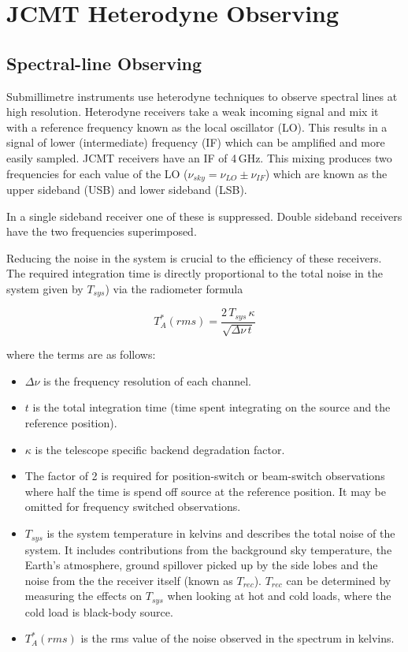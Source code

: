 \documentclass[twoside,11pt]{article}
\newcommand{\xlabel}[1]{}
\renewcommand{\_}{\texttt{\symbol{95}}}
\begin{document}
\clearpage
\section{\xlabel{het_overview}JCMT Heterodyne Observing}
\label{sec:het}
\subsection{\xlabel{specline}Spectral-line Observing}
Submillimetre instruments use heterodyne techniques to observe spectral lines at high resolution. Heterodyne receivers take a weak incoming signal and mix it with a reference frequency known as the local oscillator (LO). This results in a signal of lower (intermediate) frequency (IF) which can be amplified and more easily sampled. JCMT receivers have an IF of 4\,GHz. This mixing produces two frequencies for each value of the LO ($\nu_{sky} = \nu_{LO}\pm\nu_{IF}$) which are known as the upper sideband (USB) and lower sideband (LSB).

In a single sideband receiver one of these is suppressed. Double sideband receivers have the two frequencies superimposed.

Reducing the noise in the system is crucial to the efficiency of these receivers. The required integration time is directly proportional to the total noise in the system given by $T_{sys}$) via the radiometer formula

\[T_A^*(rms) = \frac{2\,T_{sys}\,\kappa}{\sqrt{\Delta\nu\,t}}\]

where the terms are as follows:
\begin{itemize}
\item $\Delta\nu$ is the frequency resolution of each channel.

\item $t$ is the total integration time (time spent integrating on the source and the reference position).

\item $\kappa$ is the telescope specific backend degradation factor.

\item The factor of 2 is required for  position-switch or beam-switch observations where half the time is spend off source at the reference position. It may be omitted for frequency switched observations.

\item $T_{sys}$ is the  system temperature in kelvins and describes the total noise of the system. It includes contributions from the background sky temperature, the Earth's atmosphere, ground spillover picked up by the side lobes and the noise from the the receiver itself (known as $T_{rec}$).  $T_{rec}$ can be determined by measuring the effects on $T_{sys}$ when looking at hot and  cold loads, where the cold load is black-body source.
\item $T^*_{A}(rms)$ is the rms value of the noise observed in the spectrum in kelvins.
\end{itemize}
\end{document}
